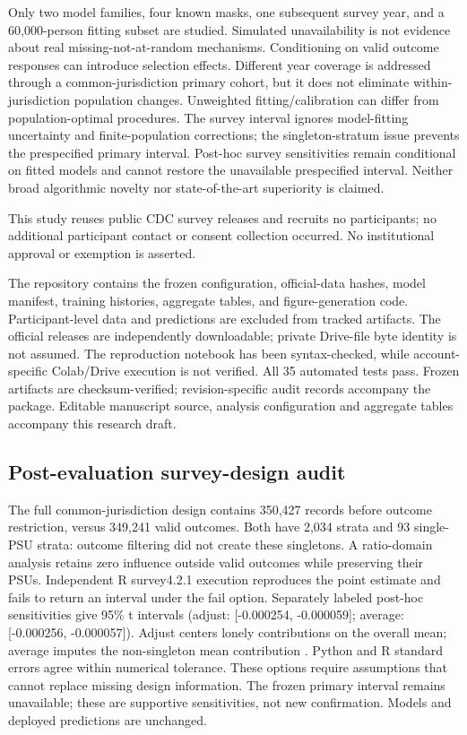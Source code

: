 \documentclass[conference,letterpaper]{IEEEtran}
\begin{document}
Only two model families, four known masks, one subsequent survey year, and a 60,000-person fitting subset are studied. Simulated unavailability is not evidence about real missing-not-at-random mechanisms. Conditioning on valid outcome responses can introduce selection effects. Different year coverage is addressed through a common-jurisdiction primary cohort, but it does not eliminate within-jurisdiction population changes. Unweighted fitting/calibration can differ from population-optimal procedures. The survey interval ignores model-fitting uncertainty and finite-population corrections; the singleton-stratum issue prevents the prespecified primary interval. Post-hoc survey sensitivities remain conditional on fitted models and cannot restore the unavailable prespecified interval. Neither broad algorithmic novelty nor state-of-the-art superiority is claimed.

This study reuses public CDC survey releases and recruits no participants; no additional participant contact or consent collection occurred. No institutional approval or exemption is asserted.

The repository contains the frozen configuration, official-data hashes, model manifest, training histories, aggregate tables, and figure-generation code. Participant-level data and predictions are excluded from tracked artifacts. The official releases are independently downloadable; private Drive-file byte identity is not assumed. The reproduction notebook has been syntax-checked, while account-specific Colab/Drive execution is not verified. All 35 automated tests pass. Frozen artifacts are checksum-verified; revision-specific audit records accompany the package. Editable manuscript source, analysis configuration and aggregate tables accompany this research draft.

\subsection{Post-evaluation survey-design audit}The full common-jurisdiction design contains 350,427 records before outcome restriction, versus 349,241 valid outcomes. Both have 2,034 strata and 93 single-PSU strata: outcome filtering did not create these singletons. A ratio-domain analysis retains zero influence outside valid outcomes while preserving their PSUs. Independent R survey4.2.1 execution reproduces the point estimate and fails to return an interval under the fail option. Separately labeled post-hoc sensitivities give 95\% t intervals (adjust: [-0.000254, -0.000059]; average: [-0.000256, -0.000057]). Adjust centers lonely contributions on the overall mean; average imputes the non-singleton mean contribution \cite{survey}. Python and R standard errors agree within numerical tolerance. These options require assumptions that cannot replace missing design information. The frozen primary interval remains unavailable; these are supportive sensitivities, not new confirmation. Models and deployed predictions are unchanged.
\end{document}
